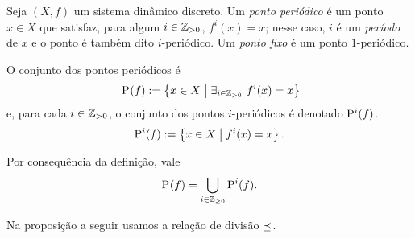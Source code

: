 \begin{definition}
Seja $(X,f)$ um sistema dinâmico discreto. Um \emph{ponto periódico} é um ponto $x \in X$ que satisfaz, para algum $i \in \Z_{>0}$, $f^i(x)=x$; nesse caso, $i$ é um \emph{período} de $x$ e o ponto é também dito $i$-periódico. %
Um \emph{ponto fixo} é um ponto $1$-periódico.

O conjunto dos pontos periódicos é
	\begin{equation*}~
	\Per(f) := \set{x \in X}{\exists_{i \in \Z_{>0}}\ f^i(x)=x}
	\end{equation*}
e, para cada $i \in \Z_{>0}$, o conjunto dos pontos $i$-periódicos é denotado $\Per[i](f)$.
	\begin{equation*}
	\Per[i](f) := \set{x \in X}{f^i(x)=x}.
	\end{equation*}
\end{definition}

Por consequência da definição, vale
	\begin{equation*}
	\Per(f) = \bigcup_{i \in \Z_{\geq 0}} \Per[i](f).
	\end{equation*}

Na proposição a seguir usamos a relação de divisão $\dleq$.%

